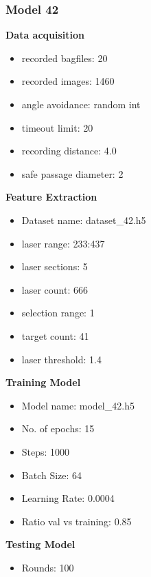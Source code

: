 \subsubsection{Model 42\label{model_42} }
\begin{multicols}{2}\textbf{Data acquisition}
\begin{itemize}
\setlength\itemsep{0.1em}
\item recorded bagfiles: 20
\item recorded images: 1460
\item angle avoidance: random int
\item timeout limit: 20
\item recording distance: 4.0
\item safe passage diameter: 2
\end{itemize}
\textbf{Feature Extraction}
\begin{itemize}
\setlength\itemsep{0.1em}
\item Dataset name: dataset\_42.h5
\item  laser range: 233:437
\item  laser sections: 5
\item  laser count: 666
\item  selection range: 1
\item  target count: 41
\item  laser threshold: 1.4
\end{itemize}
\columnbreak\textbf{Training Model}
\begin{itemize}
\setlength\itemsep{0.1em}
\item  Model name: model\_42.h5
\item  No. of epochs: 15
\item  Steps: 1000
\item  Batch Size: 64
\item  Learning Rate: 0.0004
\item  Ratio val vs training: 0.85
\end{itemize}
\textbf{Testing Model}
\begin{itemize}
\setlength\itemsep{0.1em}
\item Rounds: 100
\newline
\newline
\newline
\newline
\newline
\newline
\newline
\newline

\end{itemize}
\end{multicols}
